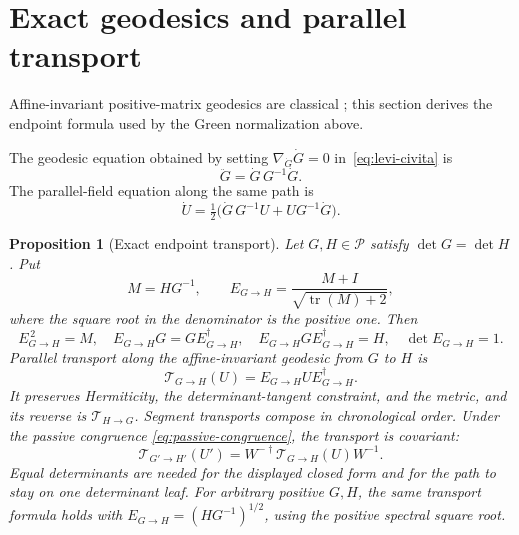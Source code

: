 \documentclass[12pt]{article}
\newtheorem{proposition}[theorem]{Proposition}
\theoremstyle{definition}
\theoremstyle{remark}
\newcommand{\Pos}{\mathcal P}
\newcommand{\tr}{\operatorname{tr}}
\begin{document}
\section{Exact geodesics and parallel transport}\label{sec:transport}

Affine-invariant positive-matrix geodesics are classical
\cite{BhatiaHolbrook2006}; this section derives the endpoint formula used by
the Green normalization above.

The geodesic equation obtained by setting
$\nabla_{\dot G}\dot G=0$ in~\eqref{eq:levi-civita} is
\begin{equation}\label{eq:geodesic-equation}
 \ddot G=\dot G\,G^{-1}\dot G.
\end{equation}
The parallel-field equation along the same path is
\begin{equation}\label{eq:parallel-ode}
 \dot U=\tfrac12\bigl(\dot G\,G^{-1}U+UG^{-1}\dot G\bigr).
\end{equation}

\begin{proposition}[Exact endpoint transport]\label{prop:exact-transport}
Let $G,H\in\Pos$ satisfy $\det G=\det H$.  Put
\[
 M=HG^{-1},\qquad
 E_{G\to H}=\frac{M+I}{\sqrt{\tr(M)+2}},
\]
where the square root in the denominator is the positive one.  Then
\begin{equation}\label{eq:transport-identities}
 E_{G\to H}^{\,2}=M,\quad
 E_{G\to H}G=GE_{G\to H}^{\dagger},\quad
 E_{G\to H}GE_{G\to H}^{\dagger}=H,\quad
 \det E_{G\to H}=1.
\end{equation}
Parallel transport along the affine-invariant geodesic from $G$ to $H$ is
\begin{equation}\label{eq:parallel-transport}
 \mathcal T_{G\to H}(U)=E_{G\to H}UE_{G\to H}^{\dagger}.
\end{equation}
It preserves Hermiticity, the determinant-tangent constraint, and the metric,
and its reverse is $\mathcal T_{H\to G}$.  Segment transports compose in
chronological order.  Under the passive congruence
\eqref{eq:passive-congruence}, the transport is covariant:
\begin{equation}\label{eq:transport-covariance}
 \mathcal T_{G'\to H'}(U')
 =W^{-\dagger}\mathcal T_{G\to H}(U)W^{-1}.
\end{equation}
Equal determinants are needed for the displayed closed form and for the
path to stay on one determinant leaf.  For arbitrary positive $G,H$, the
same transport formula holds with $E_{G\to H}=(HG^{-1})^{1/2}$, using the
positive spectral square root.
\end{proposition}
\end{document}
